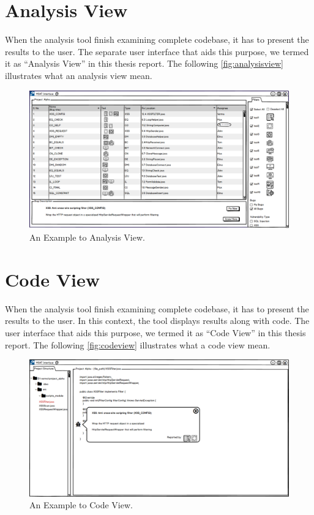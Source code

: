 \section{Analysis View}

When the analysis tool finish examining complete codebase, it has to present the results to the user. The separate user interface that aids this purpose, we termed it as “Analysis View” in this thesis report. The following \autoref{fig:analysisview} illustrates what an analysis view mean.

\begin{figure}[hbt!]
	\centering
	\includegraphics[width=\linewidth]{figures/solution_ideas_snaps/S21_single_list}
	\caption{An Example to Analysis View.\cite{B}}
	\label{fig:analysisview}
\end{figure}

\section{Code View}

When the analysis tool finish examining complete codebase, it has to present the results to the user. In this context, the tool displays results along with code. The user interface that aids this purpose, we termed it as “Code View” in this thesis report. The following \autoref{fig:codeview} illustrates what a code view mean. \\

\begin{figure}[hbt!]
	\centering
	\includegraphics[width=\linewidth]{figures/solution_ideas_snaps/S21_single_icon}
	\caption{An Example to Code View.\cite{B}}
	\label{fig:codeview}
\end{figure}

\let\cleardoublepage\clearpage